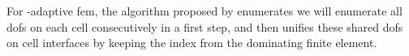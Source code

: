 








For \hp-adaptive \gls{fem}, the algorithm proposed by \textcite[Sec.~4.2]{bangerth2009} enumerates we will enumerate all \glspl{dof} on each cell consecutively in a first step, and then unifies these shared \glspl{dof} on cell interfaces by keeping the index from the dominating finite element.

